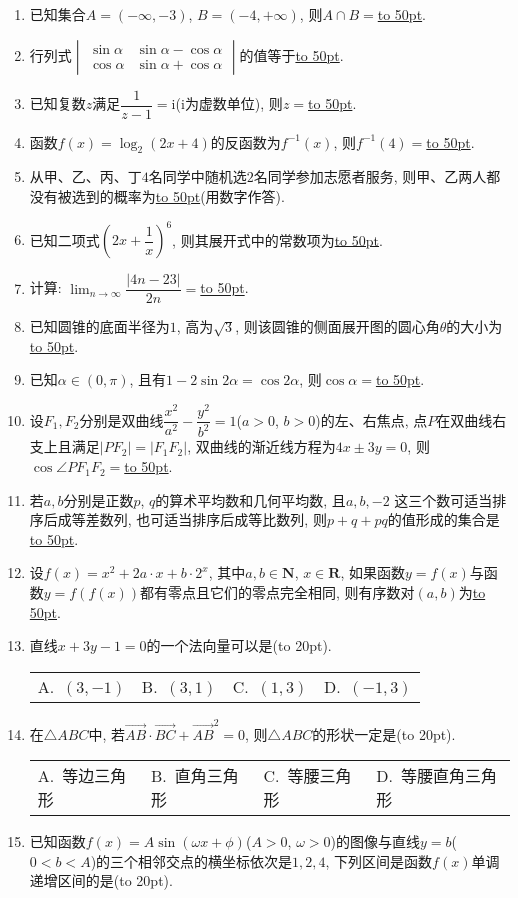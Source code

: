 \documentclass[10pt,a4paper]{article}
\newcommand{\blank}[1]{\underline{\hbox to #1pt{}}}
\newcommand{\bracket}[1]{(\hbox to #1pt{})}
\newcommand{\fourch}[4]{\par\begin{tabular}{p{.23\textwidth}p{.23\textwidth}p{.23\textwidth}p{.23\textwidth}}
A.~#1 &B.~#2& C.~#3& D.~#4
\end{tabular}}
\begin{document}
\begin{enumerate}[1.]
\item 已知集合$A=(-\infty ,-3)$, $B=(-4,+\infty)$, 则$A\cap B=$\blank{50}.
\item 行列式$\begin{vmatrix}   \sin \alpha &  \sin \alpha -\cos \alpha   \\\cos \alpha  & \sin \alpha +\cos \alpha   \end{vmatrix}$的值等于\blank{50}.
\item 已知复数$z$满足$\dfrac 1{z-1}=\mathrm{i}$($\mathrm{i}$为虚数单位), 则$z=$\blank{50}.
\item 函数$f(x)=\log_2(2x+4)$的反函数为$f^{-1}(x)$, 则$f^{-1}(4)=$\blank{50}.
\item 从甲、乙、丙、丁$4$名同学中随机选$2$名同学参加志愿者服务, 则甲、乙两人都没有被选到的概率为\blank{50}(用数字作答).
\item 已知二项式$(2x+\dfrac 1x)^6$, 则其展开式中的常数项为\blank{50}.
\item 计算: $\displaystyle\lim_{n\to \infty} \dfrac{|4n-23|}{2n}=$\blank{50}.
\item 已知圆锥的底面半径为$1$, 高为$\sqrt 3$, 则该圆锥的侧面展开图的圆心角$\theta$的大小为\blank{50}.
\item 已知$\alpha \in (0,\pi)$, 且有$1-2\sin 2\alpha =\cos 2\alpha$, 则$\cos \alpha =$\blank{50}.
\item 设$F_1,F_2$分别是双曲线$\dfrac{x^2}{a^2}-\dfrac{y^2}{b^2}=1$($a>0$, $b>0$)的左、右焦点, 点$P$在双曲线右支上且满足$|PF_2|=|F_1F_2|$, 双曲线的渐近线方程为$4x\pm 3y=0$, 则$\cos \angle PF_1F_2=$\blank{50}.
\item 若$a,b$分别是正数$p$, $q$的算术平均数和几何平均数, 且$a,b,-2$ 这三个数可适当排序后成等差数列, 也可适当排序后成等比数列, 则$p+q+pq$的值形成的集合是\blank{50}.
\item 设$f(x)=x^2+2a\cdot x+b\cdot 2^x$, 其中$a,b\in \mathbf{N}$, $x\in \mathbf{R}$, 如果函数$y=f(x)$与函数$y=f(f(x))$都有零点且它们的零点完全相同, 则有序数对$(a,b)$为\blank{50}.
\item 直线$x+3y-1=0$的一个法向量可以是\bracket{20}.
\fourch{$(3,-1)$}{$(3,1)$}{$(1,3)$}{$(-1,3)$}
\item 在$\triangle ABC$中, 若$\overrightarrow{AB}\cdot \overrightarrow{BC}+\overrightarrow{AB}^2=0$, 则$\triangle ABC$的形状一定是\bracket{20}.
\fourch{等边三角形}{直角三角形}{等腰三角形}{等腰直角三角形}
\item 已知函数$f(x)=A\sin (\omega x+\phi)$($A>0$, $\omega >0$)的图像与直线$y=b$($0<b<A$)的三个相邻交点的横坐标依次是$1,2,4$, 下列区间是函数$f(x)$单调递增区间的是\bracket{20}.

\end{enumerate}
\end{document}
